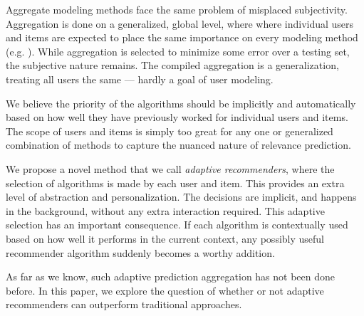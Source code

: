 Aggregate modeling methods face the same problem of misplaced subjectivity. 
Aggregation is done on a generalized, global level,
where where individual users and items are expected to place the same importance on every modeling method
(e.g. \cite{Aslam2001, Claypool1999, Bell2007, Carmel2009, Bender2005}).
While aggregation is selected to minimize some error over a testing set,
the subjective nature remains. The compiled aggregation is a generalization,
treating all users the same --- hardly a goal of user modeling.

We believe the priority of the algorithms should be implicitly and automatically
based on how well they have previously worked for individual users and items.
The scope of users and items is simply too great for any one or generalized combination
of methods to capture the nuanced nature of relevance prediction.

We propose a novel method that we call \emph{adaptive recommenders}, where 
the selection of algorithms is made by each user and item.
This provides an extra level of abstraction and personalization.
The decisions are implicit, and happens in the background, without any extra interaction required.
This adaptive selection has an important consequence. 
If each algorithm is contextually used based on how well it performs in the current context,
any possibly useful recommender algorithm suddenly becomes a worthy addition.

As far as we know, such adaptive prediction aggregation has not been done before.
In this paper, we explore the question of whether or not
adaptive recommenders can outperform traditional approaches.
